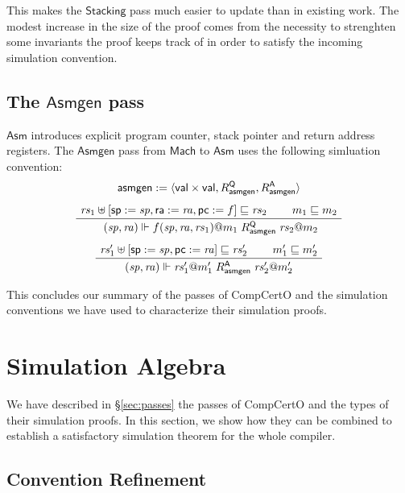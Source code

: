 \documentclass[sigplan,10pt,review,anonymous]{acmart}\settopmatter{printfolios=true,printccs=false,printacmref=false}
\newcommand{\kw}[1]{\ensuremath{ \mathsf{#1} }}
\begin{document}
This makes the \kw{Stacking} pass
much easier to update than in existing work.
The modest increase in the size of the proof
comes from the necessity to strenghten
some invariants the proof keeps track of
in order to satisfy the incoming simulation convention.


\subsection{The \kw{Asmgen} pass} %

\kw{Asm} introduces explicit
program counter, stack pointer and return address registers.
The \kw{Asmgen} pass from \kw{Mach} to \kw{Asm}
uses the following simluation convention:
\begin{gather*}
  \kw{asmgen} := \langle \kw{val} \times \kw{val},
    R_\kw{asmgen}^\kw{Q}, R_\kw{asmgen}^\kw{A} \rangle
  \\[1ex]
  \AxiomC{$\mathit{rs}_1 \uplus
    [\kw{sp} := \mathit{sp}, \kw{ra} := \mathit{ra}, \kw{pc} := f]
    \sqsubseteq \mathit{rs}_2$}
  \AxiomC{$m_1 \sqsubseteq m_2$}
  \BinaryInfC{
    $(\mathit{sp}, \mathit{ra}) \Vdash
     f(\mathit{sp}, \mathit{ra}, \mathit{rs}_1)@m_1
     \mathrel{R_\kw{asmgen}^\kw{Q}}
     \mathit{rs}_2@m_2$}
  \DisplayProof
  \\[1ex]
  \AxiomC{$
    \mathit{rs}_1' \uplus [\kw{sp} := \mathit{sp}, \kw{pc} := \mathit{ra}]
    \sqsubseteq \mathit{rs}_2'$}
  \AxiomC{$m_1' \sqsubseteq m_2'$}
  \BinaryInfC{$
    (\mathit{sp}, \mathit{ra}) \Vdash \mathit{rs}_1'@m_1'
    \mathrel{R_\kw{asmgen}^\kw{A}}
    \mathit{rs}_2'@m_2'$}
  \DisplayProof
\end{gather*}

This concludes our summary of the passes of CompCertO
and the simulation conventions we have used
to characterize their simulation proofs.



\section{Simulation Algebra} \label{sec:simalg} %

We have described in \S\ref{sec:passes}
the passes of CompCertO
and the types of their simulation proofs.
In this section,
we show how they can be combined to establish
a satisfactory simulation theorem
for the whole compiler.

\subsection{Convention Refinement} %
\end{document}
